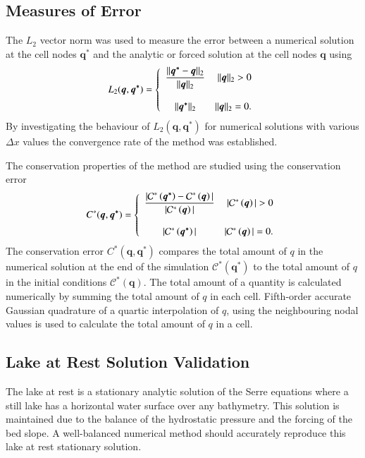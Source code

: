 \documentclass[times]{elsarticle}
\newcommand{\vecn}[1]{\boldsymbol{#1}}
\begin{document}
\subsection{Measures of Error}
The $L_2$ vector norm was used to measure the error between a numerical solution at the cell nodes $\vecn{q^*}$ and the analytic or forced solution at the cell nodes $\vecn{q}$ using
\begin{equation*}
L_2(\vecn{q},\vecn{q^*}) =  \left\lbrace \begin{array}{c r} 
\dfrac{||\vecn{q^*} - \vecn{q}||_{2}}{||\vecn{q}||_{2}} & ||\vecn{q}||_{2} > 0 \\ \\
{||\vecn{q^*}||_{2}} & ||\vecn{q}||_{2} = 0 . \end{array}\right. 
\label{eqn:L1qdef} 
\end{equation*} 
By investigating the behaviour of $L_2(\vecn{q},\vecn{q^*})$ for numerical solutions with various $\Delta x$ values the convergence rate of the method was established. 

The conservation properties of the method are studied using the conservation error
\begin{equation*}
C^*(\vecn{q},\vecn{q^*}) =  \left\lbrace \begin{array}{c r} 
\dfrac{|\mathcal{C}^*\left({\vecn{q^*}}\right) - \mathcal{C}^*\left({\vecn{q}}\right)| }{|\mathcal{C}^*\left({\vecn{q}}\right)|} & |\mathcal{C}^*\left({\vecn{q}}\right)| > 0 \\ \\
|\mathcal{C}^*\left({\vecn{q^*}}\right)| & |\mathcal{C}^*\left({\vecn{q}}\right)| = 0  . \end{array}\right. 
\end{equation*}
The conservation error $C^*(\vecn{q},\vecn{q^*})$ compares the total amount of $q$ in the numerical solution at the end of the simulation $\mathcal{C}^*\left({\vecn{q^*}}\right)$ to the total amount of $q$ in the initial conditions $\mathcal{C}^*\left({\vecn{q}}\right)$. The total amount of a quantity is calculated numerically by summing the total amount of $q$ in each cell. Fifth-order accurate Gaussian quadrature of a quartic interpolation of $q$, using the neighbouring nodal values is used to calculate the total amount of $q$ in a cell.

\subsection{Lake at Rest Solution Validation}
The lake at rest is a stationary analytic solution of the Serre equations where a still lake has a horizontal water surface over any bathymetry. This solution is maintained due to the balance of the hydrostatic pressure and the forcing of the bed slope. A well-balanced numerical method should accurately reproduce this lake at rest stationary solution.
\end{document}
